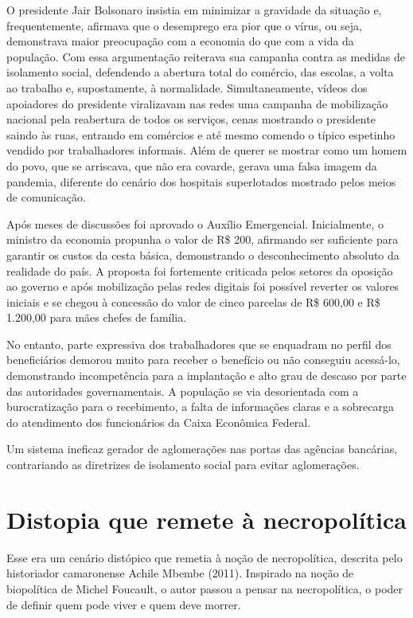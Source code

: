 O presidente Jair Bolsonaro insistia em minimizar a gravidade da
situação e, frequentemente, afirmava que o desemprego era pior que o
vírus, ou seja, demonstrava maior preocupação com a economia do que com
a vida da população. Com essa argumentação reiterava sua campanha contra
as medidas de isolamento social, defendendo a abertura total do
comércio, das escolas, a volta ao trabalho e, supostamente, à
normalidade. Simultaneamente, vídeos dos apoiadores do presidente
viralizavam nas redes uma campanha de mobilização nacional pela
reabertura de todos os serviços, cenas mostrando o presidente saindo às
ruas, entrando em comércios e até mesmo comendo o típico espetinho
vendido por trabalhadores informais. Além de querer se mostrar como um
homem do povo, que se arriscava, que não era covarde, gerava uma falsa
imagem da pandemia, diferente do cenário dos hospitais superlotados
mostrado pelos meios de comunicação.

Após meses de discussões foi aprovado o Auxílio Emergencial.
Inicialmente, o ministro da economia propunha o valor de R\$ 200,
afirmando ser suficiente para garantir os custos da cesta básica,
demonstrando o desconhecimento absoluto da realidade do país. A proposta
foi fortemente criticada pelos setores da oposição ao governo e após
mobilização pelas redes digitais foi possível reverter os valores
iniciais e se chegou à concessão do valor de cinco parcelas de R\$
600,00 e R\$ 1.200,00 para mães chefes de família.

No entanto, parte expressiva dos trabalhadores que se enquadram no
perfil dos beneficiários demorou muito para receber o benefício ou não
conseguiu acessá-lo, demonstrando incompetência para a implantação e
alto grau de descaso por parte das autoridades governamentais. A
população se via desorientada com a burocratização para o recebimento, a
falta de informações claras e a sobrecarga do atendimento dos
funcionários da Caixa Econômica Federal.

Um sistema ineficaz gerador de aglomerações nas portas das agências
bancárias, contrariando as diretrizes de isolamento social para evitar
aglomerações.

\section{Distopia que remete à necropolítica}

Esse era um cenário distópico que remetia à noção de necropolítica,
descrita pelo historiador camaronense Achile Mbembe (2011). Inspirado na
noção de biopolítica de Michel Foucault, o autor passou a pensar na
necropolítica, o poder de definir quem pode viver e quem deve morrer.

